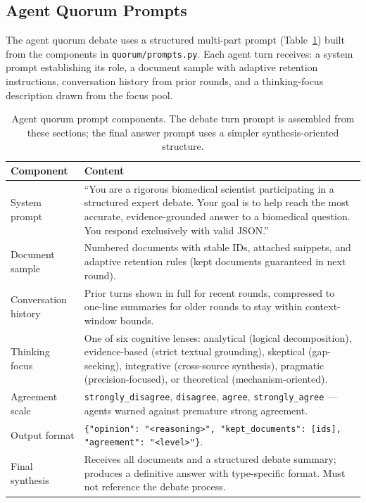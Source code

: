 \subsection{Agent Quorum Prompts}
The agent quorum debate uses a structured multi-part prompt (Table~\ref{tab:prompts-quorum}) built from the components in \texttt{quorum/prompts.py}. Each agent turn receives: a system prompt establishing its role, a document sample with adaptive retention instructions, conversation history from prior rounds, and a thinking-focus description drawn from the focus pool.
\begin{table}[ht]
  \centering
  \caption{Agent quorum prompt components. The debate turn prompt is assembled from these sections; the final answer prompt uses a simpler synthesis-oriented structure.}
  \label{tab:prompts-quorum}
  \footnotesize
  \begin{tabularx}{\textwidth}{lX}
    \toprule
    \textbf{Component} & \textbf{Content} \\
    \midrule
    System prompt & ``You are a rigorous biomedical scientist participating in a structured expert debate. Your goal is to help reach the most accurate, evidence-grounded answer to a biomedical question. You respond exclusively with valid JSON.'' \\
    \midrule
    Document sample & Numbered documents with stable IDs, attached snippets, and adaptive retention rules (kept documents guaranteed in next round). \\
    \midrule
    Conversation history & Prior turns shown in full for recent rounds, compressed to one-line summaries for older rounds to stay within context-window bounds. \\
    \midrule
    Thinking focus & One of six cognitive lenses: analytical (logical decomposition), evidence-based (strict textual grounding), skeptical (gap-seeking), integrative (cross-source synthesis), pragmatic (precision-focused), or theoretical (mechanism-oriented). \\
    \midrule
    Agreement scale & \texttt{strongly\_disagree}, \texttt{disagree}, \texttt{agree}, \texttt{strongly\_agree} --- agents warned against premature strong agreement. \\
    \midrule
    Output format & \texttt{\{"opinion": "<reasoning>", "kept\_documents": [ids], "agreement": "<level>"\}}. \\
    \midrule
    Final synthesis & Receives all documents and a structured debate summary; produces a definitive answer with type-specific format. Must not reference the debate process. \\
    \bottomrule
  \end{tabularx}
\end{table}
